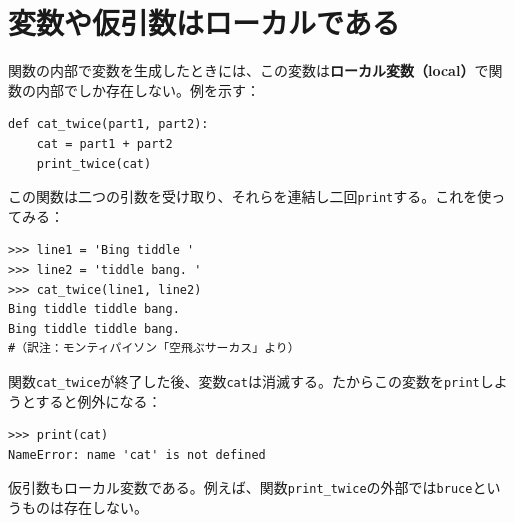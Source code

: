 \documentclass[a4j,12pt,makeidx]{jbook}
\begin{document}
\section{変数や仮引数はローカルである}
関数の内部で変数を生成したときには、この変数は{\bf ローカル変数（local）}で関数の内部でしか存在しない。例を示す：
\begin{verbatim}
def cat_twice(part1, part2):
    cat = part1 + part2
    print_twice(cat)
\end{verbatim}
この関数は二つの引数を受け取り、それらを連結し二回{\tt print}する。これを使ってみる：
\begin{verbatim}
>>> line1 = 'Bing tiddle '
>>> line2 = 'tiddle bang. '
>>> cat_twice(line1, line2)
Bing tiddle tiddle bang. 
Bing tiddle tiddle bang. 
#（訳注：モンティパイソン「空飛ぶサーカス」より）
\end{verbatim}
関数{\tt cat\_twice}が終了した後、変数{\tt cat}は消滅する。たからこの変数を{\tt print}しようとすると例外になる：
\begin{verbatim}
>>> print(cat)
NameError: name 'cat' is not defined
\end{verbatim} \par
仮引数もローカル変数である。例えば、関数{\tt print\_twice}の外部では{\tt bruce}というものは存在しない。
%
\end{document}
